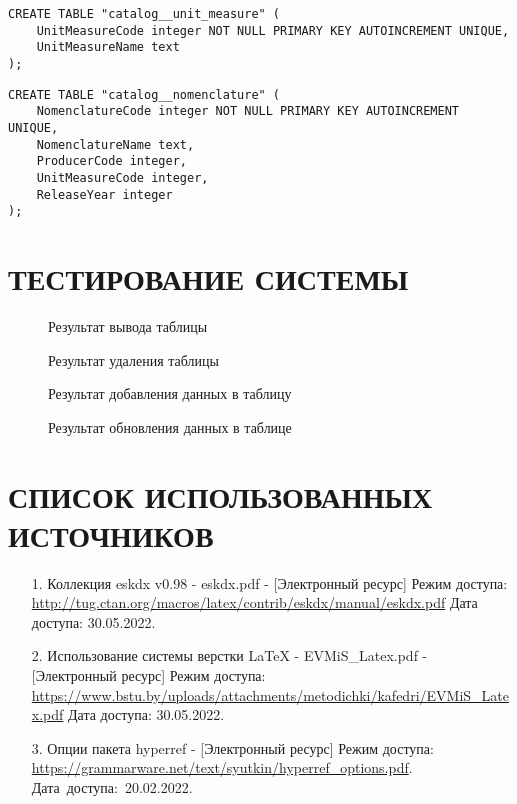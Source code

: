 \documentclass[
    12pt, %
    a4paper, %
    simple, %
    floatsection %
]{eskdtext}
\begin{document}
\begin{lstlisting}[name=Справочник "Единицы хранения"]
CREATE TABLE "catalog__unit_measure" (
    UnitMeasureCode integer NOT NULL PRIMARY KEY AUTOINCREMENT UNIQUE,
    UnitMeasureName text
);
\end{lstlisting}

\begin{lstlisting}[name=Справочник "Номенклатура"]
CREATE TABLE "catalog__nomenclature" (
    NomenclatureCode integer NOT NULL PRIMARY KEY AUTOINCREMENT UNIQUE,
    NomenclatureName text,
    ProducerCode integer,
    UnitMeasureCode integer,
    ReleaseYear integer
);
\end{lstlisting}

\newpage
\section{ТЕСТИРОВАНИЕ СИСТЕМЫ}

\begin{figure}[!h]
    \centering
    \caption{Результат вывода таблицы}
\end{figure}

\begin{figure}[!h]
    \centering
    \caption{Результат удаления таблицы}
\end{figure}

\begin{figure}[!h]
    \centering
    \caption{Результат добавления данных в таблицу}
\end{figure}

\begin{figure}[!h]
    \centering
    \caption{Результат обновления данных в таблице}
\end{figure}


\newpage
{}
\section*{СПИСОК ИСПОЛЬЗОВАННЫХ ИСТОЧНИКОВ}
\begin{enumerate}
    \item[1.] Коллекция eskdx v0.98 - eskdx.pdf
    - [Электронный ресурс]
    Режим доступа: \url{http://tug.ctan.org/macros/latex/contrib/eskdx/manual/eskdx.pdf}
    Дата доступа: 30.05.2022.

    \item[2.] Использование системы верстки LaTeX - EVMiS\_Latex.pdf
    - [Электронный ресурс]
    Режим доступа: \url{https://www.bstu.by/uploads/attachments/metodichki/kafedri/EVMiS_Latex.pdf}
    Дата доступа: 30.05.2022.

    \item[3.] Опции пакета hyperref
    - [Электронный ресурс]
    Режим доступа: \url{https://grammarware.net/text/syutkin/hyperref_options.pdf}.
    Дата~доступа:~20.02.2022.
\end{enumerate}


\newpage
\end{document}
